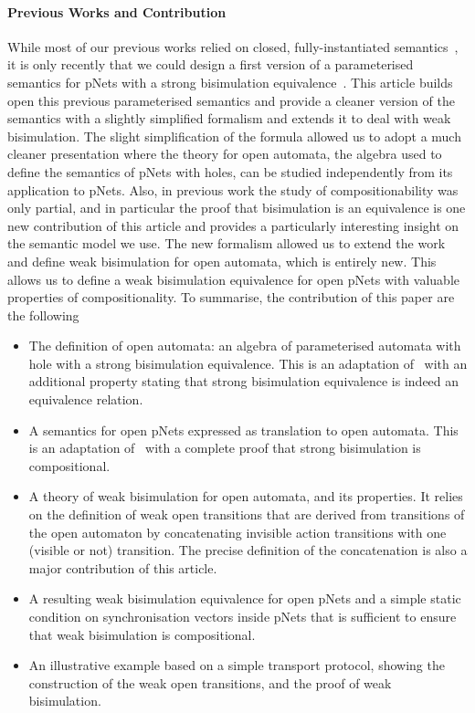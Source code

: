 \documentclass{lmcs}
\begin{document}
\paragraph{Previous Works and Contribution}
While most of our previous works relied on closed, fully-instantiated semantics~\cite{BBCHM:article2008,AmeurBoulifa2017,HKM-FASE16}, it is only recently that we could design a first version of a  parameterised semantics for pNets with a strong bisimulation equivalence~\cite{henrio:Forte2016}. This article builds open this previous parameterised semantics and provide a cleaner version of the semantics with a slightly simplified formalism and extends it to deal with weak bisimulation. The slight simplification of the formula allowed us to adopt a much cleaner presentation where the theory for open automata, the algebra used to define the semantics of pNets with holes, can be studied independently from its application to pNets. Also, in previous work the study of compositionability was only partial, and in particular the proof that bisimulation is an equivalence is one new contribution of this article and provides a particularly interesting insight on the semantic model we use.
The new formalism allowed us to extend the work and define weak bisimulation  for open automata, which is entirely new. This allows us to define a weak bisimulation equivalence for open pNets with valuable properties of compositionality. 
To summarise, the contribution of this paper are the following
\begin{itemize}
\item The definition of open automata: an algebra of parameterised automata with hole with a strong bisimulation equivalence. This is an adaptation of~\cite{henrio:Forte2016} with an additional property stating that strong bisimulation equivalence is indeed an equivalence relation.
\item A semantics for open pNets expressed as translation to open automata. This is an adaptation of~\cite{henrio:Forte2016} with a complete proof that strong bisimulation is compositional.
\item A theory of weak bisimulation for open automata, and its properties. It relies on the definition of weak open transitions that are derived from transitions of the open automaton by concatenating invisible action transitions with one (visible or not) transition. The precise definition of the concatenation is also a major contribution of this article.
\item A resulting weak bisimulation equivalence for open pNets and a simple static condition on synchronisation vectors inside pNets that is sufficient to ensure that weak bisimulation is compositional.
\item An illustrative example based on a simple transport protocol, showing the construction of the weak open transitions, and the proof of weak bisimulation.
\end{itemize}
\end{document}
